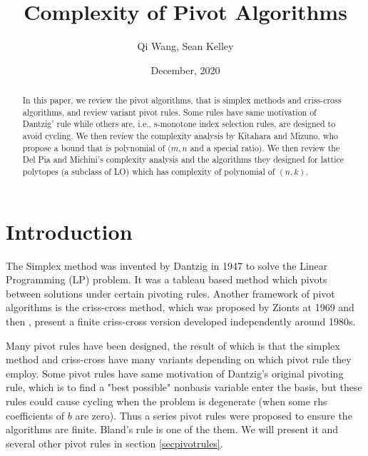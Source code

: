\documentclass[11pt]{article}
\begin{document}
\newtheorem{theorem}{Theorem}
\newtheorem{corollary}{Corollary}
\newtheorem{lemma}{Lemma}
\newtheorem{definition}{Definition}
\DeclarePairedDelimiter{\norm}{\lVert}{\rVert} 

\title{Complexity of Pivot Algorithms}
\author{Qi Wang, Sean Kelley}
\date{December, 2020}
\maketitle


\begin{abstract}
In this paper, we review the pivot algorithms, that is simplex methods and criss-cross algorithms, and review variant pivot rules. Some rules have same motivation of Dantzig' rule while others are, i.e., s-monotone index selection rules, are designed to avoid cycling. We then review the complexity analysis by Kitahara and Mizuno, who propose a bound that is polynomial of $(m, n$ and a special ratio). We then review the Del Pia and Michini's complexity analysis and the algorithms they designed for lattice polytopes (a subclass of LO) which has complexity of polynomial of $(n,k)$.

\end{abstract}


\section{Introduction}
The Simplex method was invented by Dantzig in 1947 \cite{dantzig1951maximization} to solve the Linear Programming (LP) problem. It was a tableau based method which pivots between solutions under certain pivoting rules. Another framework of pivot algorithms is the criss-cross method, which was proposed by Zionts at 1969 \cite{fukuda1997criss} and then \cite{terlaky1987finite}, \cite{chang1979least} present a finite criss-cross version developed independently around 1980s. 

Many pivot rules have been designed, the result of which is that the simplex method and criss-cross have many variants depending on which pivot rule they employ. Some pivot rules have same motivation of Dantzig's original pivoting rule, which is to find a "best possible" nonbasis variable enter the basis, but these rules could cause cycling when the problem is degenerate (when some rhs coefficients of $b$ are zero). Thus a series pivot rules were proposed to ensure the algorithms are finite. Bland's rule is one of the them. We will present it and several other pivot rules in section \ref{secpivotrules}.
\end{document}
